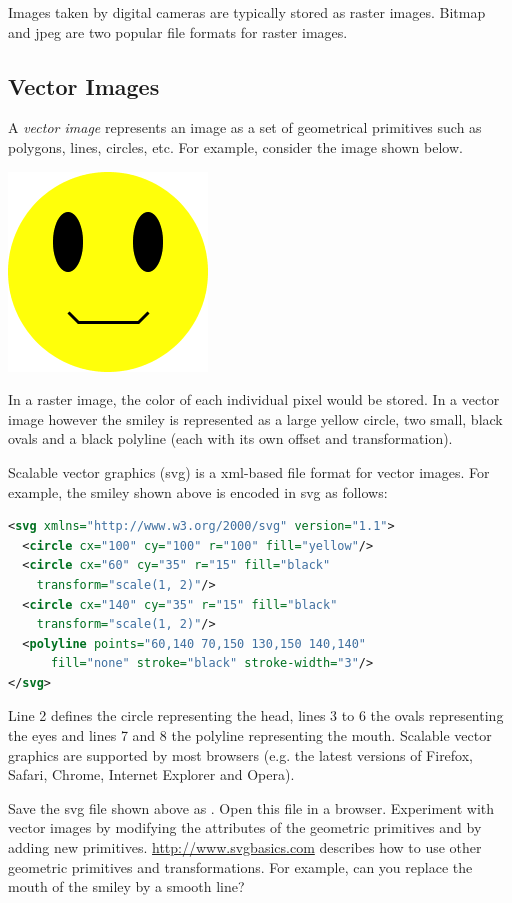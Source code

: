 \documentclass{book}
\begin{document}
Images taken by digital cameras are typically stored as raster images. Bitmap and jpeg are two popular file formats for raster images.

\subsection{Vector Images}
A \emph{vector image} represents an image as a set of geometrical primitives such as polygons, lines, circles, etc. For example, consider the image shown below. 

\begin{center}
\includegraphics[scale=0.5]{smiley.png}
\end{center}

In a raster image, the color of each individual pixel would be stored. In a vector image however the smiley is represented as a large yellow circle, two small, black ovals and a black polyline (each with its own offset and transformation).

Scalable vector graphics (svg) is a xml-based file format for vector images. For example, the smiley shown above is encoded in svg as follows:  
\begin{lstlisting}[language=xml,basicstyle=\ttfamily\small]
<svg xmlns="http://www.w3.org/2000/svg" version="1.1">
  <circle cx="100" cy="100" r="100" fill="yellow"/>
  <circle cx="60" cy="35" r="15" fill="black" 
    transform="scale(1, 2)"/>
  <circle cx="140" cy="35" r="15" fill="black"
    transform="scale(1, 2)"/>
  <polyline points="60,140 70,150 130,150 140,140" 
      fill="none" stroke="black" stroke-width="3"/>
</svg>
\end{lstlisting}
Line 2 defines the circle representing the head, lines 3 to 6 the ovals representing the eyes and lines 7 and 8 the polyline representing the mouth. Scalable vector graphics are supported by most browsers (e.g. the latest versions of Firefox, Safari, Chrome, Internet Explorer and Opera).

\begin{exercise}
Save the svg file shown above as . Open this file in a browser. Experiment with vector images by modifying the attributes of the geometric primitives and by adding new primitives. \href{http://www.svgbasics.com}{http://www.svgbasics.com} describes how to use other geometric primitives and transformations. For example, can you replace the mouth of the smiley by a smooth line?
\end{exercise}
\end{document}

